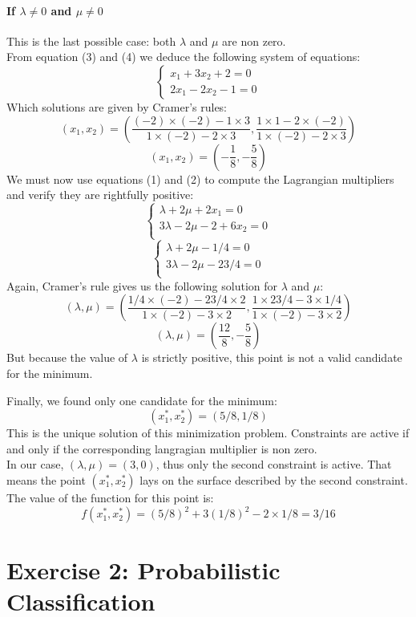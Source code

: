 \documentclass[a4paper, 10pt]{article}
\begin{document}
\paragraph{If $\lambda\ne0$ and $\mu\ne0$}
This is the last possible case: both $\lambda$ and $\mu$ are non zero.
\\
From equation (3) and (4) we deduce the following system of equations:
$$
\left\{\begin{array}{c}
    x_1+3x_2+2=0\\
    2x_1-2x_2-1=0
\end{array}\right.
$$
Which solutions are given by Cramer's rules:
$$
(x_1,x_2) = \left(\frac{(-2)\times(-2)-1\times3}{1\times(-2)-2\times3}, \frac{1\times1-2\times(-2)}{1\times(-2)-2\times3}\right)
$$
$$
(x_1,x_2) = (-\frac{1}{8}, -\frac{5}{8})
$$
We must now use equations (1) and (2) to compute the Lagrangian multipliers and verify they are rightfully positive:
$$
\left\{\begin{array}{c}
    \lambda+2\mu +2x_1= 0\\
    3\lambda-2\mu -2+6x_2=0\\
\end{array}\right.
$$
$$
\left\{\begin{array}{c}
    \lambda+2\mu -1/4= 0\\
    3\lambda-2\mu -23/4=0\\
\end{array}\right.
$$
Again, Cramer's rule gives us the following solution for $\lambda$ and $\mu$: 
$$
(\lambda,\mu) = \left(\frac{1/4\times(-2)-23/4\times2}{1\times(-2)-3\times2},\frac{1\times23/4-3\times1/4}{1\times(-2)-3\times2}\right)
$$
$$
(\lambda,\mu) = (\frac{12}{8},-\frac{5}{8})
$$
But because the value of $\lambda$ is strictly positive, this point is not a valid candidate for the minimum.

Finally, we found only one candidate for the minimum:
$$
(x_1^*,x_2^*)=(5/8, 1/8)
$$
This is the unique solution of this minimization problem. Constraints are active if and only if
the corresponding langragian multiplier is non zero. 
\\
In our case, $(\lambda, \mu) = (3,0)$, thus only the second constraint is active. That means the point
$(x_1^*,x_2^*)$ lays on the surface described by the second constraint.
\\
The value of the function for this point is:
$$
f(x_1^*,x_2^*) = (5/8)^2 +3(1/8)^2-2\times1/8 = 3/16
$$

\section{Exercise 2: Probabilistic Classification}
\end{document}
